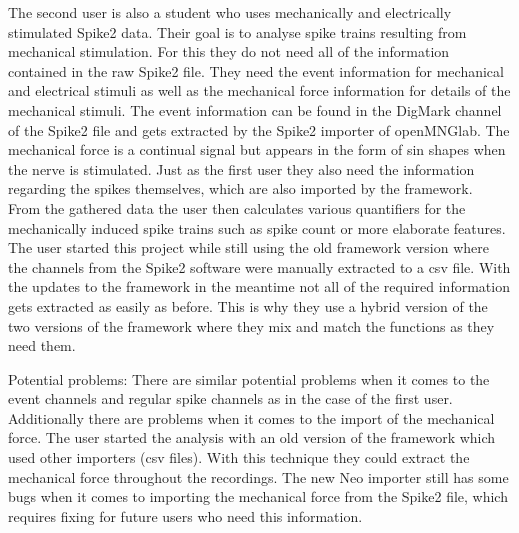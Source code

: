 The second user is also a student who uses mechanically and electrically stimulated Spike2 data. Their goal is to analyse spike trains resulting from mechanical stimulation. For this they do not need all of the information contained in the raw Spike2 file. They need the event information for mechanical and electrical stimuli as well as the mechanical force information for details of the mechanical stimuli. The event information can be found in the DigMark channel of the Spike2 file and gets extracted by the Spike2 importer of openMNGlab. The mechanical force is a continual signal but appears in the form of sin shapes when the nerve is stimulated.
Just as the first user they also need the information regarding the spikes themselves, which are also imported by the framework.\\
From the gathered data the user then calculates various quantifiers for the mechanically induced spike trains such as spike count or more elaborate features. The user started this project while still using the old framework version where the channels from the Spike2 software were manually extracted to a csv file. With the updates to the framework in the meantime not all of the required information gets extracted as easily as before. This is why they use a hybrid version of the two versions of the framework where they mix and match the functions as they need them.

Potential problems: There are similar potential problems when it comes to the event channels and regular spike channels as in the case of the first user. Additionally there are problems when it comes to the import of the mechanical force. The user started the analysis with an old version of the framework which used other importers (csv files). With this technique they could extract the mechanical force throughout the recordings. The new Neo importer still has some bugs when it comes to importing the mechanical force from the Spike2 file, which requires fixing for future users who need this information.


